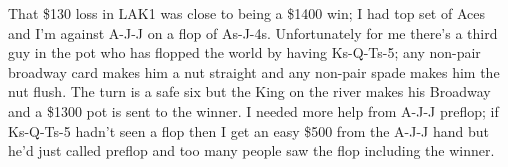 That \$130 loss in LAK1 was close to being a \$1400 win; I had top set
of Aces and I'm against A-J-J on a flop of As-J-4s. Unfortunately for
me there's a third guy in the pot who has flopped the world by having
Ks-Q-Ts-5; any non-pair broadway card makes him a nut straight
and any non-pair spade makes him the nut flush. The turn is a safe six
but the King on the river makes his Broadway and a \$1300 pot is sent
to the winner. I needed more help from A-J-J preflop; if Ks-Q-Ts-5
hadn't seen a flop then I get an easy \$500 from the A-J-J hand but
he'd just called preflop and too many people saw the flop including
the winner.
